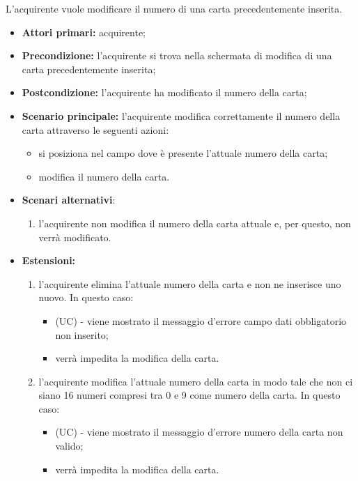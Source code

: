 L'acquirente vuole modificare il numero di una carta precedentemente inserita.
\begin{itemize}
    \item \textbf{Attori primari:} acquirente;
    \item \textbf{Precondizione:} l'acquirente si trova nella schermata di modifica di una carta precedentemente inserita;
    \item \textbf{Postcondizione:} l'acquirente ha modificato il numero della carta;
    \item \textbf{Scenario principale:} l'acquirente modifica correttamente il numero della carta attraverso le seguenti azioni:
    \begin{itemize}
        \item si posiziona nel campo dove è presente l'attuale numero della carta;
        \item modifica il numero della carta.
    \end{itemize}
    \item \textbf{Scenari alternativi}:
    \begin{enumerate}[label=\lett]
        \item l'acquirente non modifica il numero della carta attuale e, per questo, non verrà modificato.
    \end{enumerate}
    \item \textbf{Estensioni:}
    \begin{enumerate}[label=\lett]
        \item l'acquirente elimina l'attuale numero della carta e non ne inserisce uno nuovo. In questo caso:
        \begin{itemize}
            \item (UC) - viene mostrato il messaggio d'errore campo dati obbligatorio non inserito;
            \item verrà impedita la modifica della carta.
        \end{itemize}
        \item l'acquirente modifica l'attuale numero della carta in modo tale che non ci siano 16 numeri compresi tra 0 e 9 come numero della carta. In questo caso:
        \begin{itemize}
            \item (UC) - viene mostrato il messaggio d'errore numero della carta non valido;
            \item verrà impedita la modifica della carta.
        \end{itemize}
    \end{enumerate}
\end{itemize}

